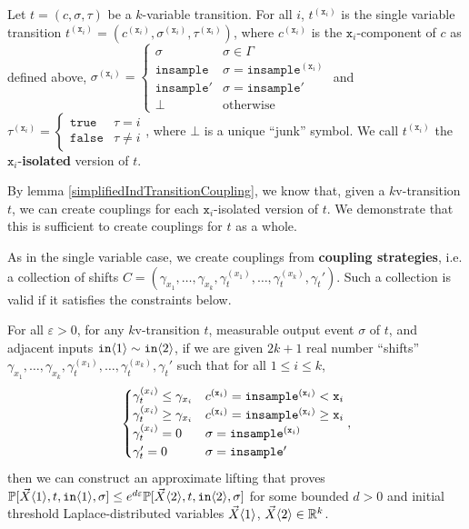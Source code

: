 \begin{defn}
    Let $t = (c, \sigma, \tau)$ be a $k$-variable transition. For all $i$, $t^{(\texttt{x}_i)}$ is the single variable transition $t^{(\texttt{x}_i)} = (c^{(\texttt{x}_i)}, \sigma^{(\texttt{x}_i)}, \tau^{(\texttt{x}_i)})$, where $c^{(\texttt{x}_i)}$ is the $\texttt{x}_i$-component of $c$ as defined above, $\sigma^{(\texttt{x}_i)} = \begin{cases}
        \sigma & \sigma \in \Gamma\\
        \texttt{insample} & \sigma = \texttt{insample}^{(\texttt{x}_i)}\\
        \texttt{insample}' & \sigma = \texttt{insample}'\\
        \bot & \text{otherwise}
    \end{cases}$ and $\tau^{(\texttt{x}_i)} = \begin{cases}
        \texttt{true} & \tau = i\\
        \texttt{false} & \tau \neq i
    \end{cases}$, where $\bot$ is a unique ``junk'' symbol. We call $t^{(\texttt{x}_i)}$ the $\texttt{x}_i$-\textbf{isolated} version of $t$. 
\end{defn}

By lemma \ref{simplifiedIndTransitionCoupling}, we know that, given a $k$v-transition $t$, we can create couplings for each $\texttt{x}_i$-isolated version of $t$. We demonstrate that this is sufficient to create couplings for $t$ as a whole. 

As in the single variable case, we create couplings from \textbf{coupling strategies}, i.e. a collection of shifts $C = (\gamma_{x_1}, \ldots, \gamma_{x_k}, \gamma_t^{(x_1)}, \ldots, \gamma_t^{(x_k)}, \gamma_t')$. Such a collection is valid if it satisfies the constraints below. 

\begin{lemma}\label{simplifiedMvParallelCouplingsLemma}
    For all $\varepsilon>0$, for any $k$v-transition $t$, measurable output event $\sigma$ of $t$, and adjacent inputs $\texttt{in}\brangle{1}\sim\texttt{in}\brangle{2}$, if we are given $2k+1$ real number ``shifts'' $\gamma_{x_1}, \ldots, \gamma_{x_k}, \gamma_t^{(x_1)}, \ldots, \gamma_t^{(x_k)}, \gamma_t'$ such that for all $1\leq i\leq k$, \[
        \begin{cases}
            \gamma_t^{(x_i)}\leq\gamma_{x_i} & c^{(\texttt{x}_i)} = \mvlguard[\texttt{x}_i]\\
            \gamma_t^{(x_i)}\geq\gamma_{x_i} & c^{(\texttt{x}_i)} = \mvgguard[\texttt{x}_i]\\
            \gamma_t^{(x_i)}=0 & \sigma = \texttt{insample}^{(\texttt{x}_i)}\\
            \gamma_t'=0 & \sigma = \texttt{insample}'
      \end{cases},
      \]
      then we can construct an approximate lifting that proves $\PP[\vec{X}\brangle{1}, t, \texttt{in}\brangle{1}, \sigma]\leq e^{d\varepsilon}\PP[\vec{X}\brangle{2}, t, \texttt{in}\brangle{2}, \sigma]$ for some bounded $d>0$ and initial threshold Laplace-distributed variables $\vec{X}\brangle{1}$, $\vec{X}\brangle{2}\in \RR^k$.
\end{lemma}

